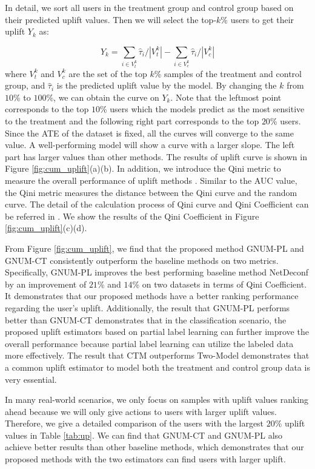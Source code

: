 In detail, we sort all users in the treatment group and control group based on their predicted uplift values. Then we will select the top-$k$\% users to get their uplift $Y_k$ as: 

\begin{equation} 
	Y_k=\sum\limits_{i \in V^k_t}{\hat{\tau}_i}/|V^k_t| - \sum\limits_{i \in V^k_c}{\hat{\tau}_i}/|V^k_c|
\label{eqn:exp_uplift}
\end{equation}
where $V^k_t$ and $V^k_c$ are the set of the top $k$\% samples of the treatment and control group, and $\hat{\tau}_i$ is the predicted uplift value by the model. By changing the $k$ from $10$\% to $100$\%, we can obtain the curve on $Y_k$. Note that the leftmost point corresponds to the top $10$\% users which the models predict as the most sensitive to the treatment and the following right part corresponds to the  top $20$\% users. Since the ATE of the dataset is fixed, all the curves will converge to the same value. A well-performing model will show a curve with a larger slope. The left part has larger values than other methods. The results of uplift curve is shown in Figure \ref{fig:cum_uplift}(a)(b). In addition, we introduce the Qini metric to measure the overall performance of uplift methods \cite{radcliffe2007using}. Similar to the AUC value, the Qini metric measures the distance between the Qini curve and the random curve. The detail of the calculation process of Qini curve and Qini Coefficient can be referred in \cite{radcliffe2007using}. We show the results of the Qini Coefficient in Figure \ref{fig:cum_uplift}(c)(d). 

From Figure \ref{fig:cum_uplift}, we find that the proposed method GNUM-PL and GNUM-CT consistently outperform the baseline methods on two metrics. Specifically, GNUM-PL improves the best performing baseline method NetDeconf by an improvement of $21$\% and $14$\% on two datasets in terms of Qini Coefficient. It demonstrates that our proposed methods have a better ranking performance regarding the user's uplift. Additionally, the result that GNUM-PL performs better than GNUM-CT demonstrates that in the classification scenario, the proposed uplift estimators based on partial label learning can further improve the overall performance because partial label learning can utilize the labeled data more effectively. The result that CTM outperforms Two-Model demonstrates that a common uplift estimator to model both the treatment and control group data is very essential. 

In many real-world scenarios, we only focus on samples with uplift values ranking ahead because we will only give actions to users with larger uplift values. Therefore, we give a detailed comparison of the users with the largest $20$\% uplift values in Table \ref{tab:up}. We can find that GNUM-CT and GNUM-PL also achieve better results than other baseline methods, which demonstrates that our proposed methods with the two estimators can find users with larger uplift.

